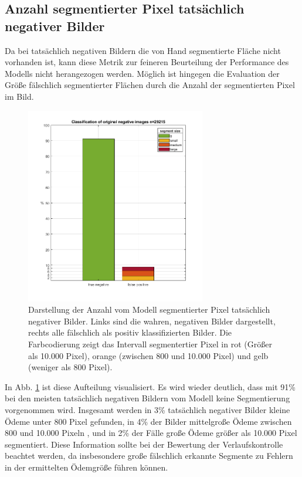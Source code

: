 \subsection{Anzahl segmentierter Pixel tatsächlich negativer Bilder}
Da bei tatsächlich negativen Bildern die von Hand segmentierte Fläche nicht vorhanden ist, kann diese Metrik zur feineren Beurteilung der Performance des Modells nicht herangezogen werden. Möglich ist hingegen die Evaluation der Größe fälschlich segmentierter Flächen durch die Anzahl der segmentierten Pixel im Bild.\newline

\begin{figure}[H]
\centering
\includegraphics[width=0.7\textwidth]{./pic/Segmentierung/trueNeg_fp_imglevel_n.png}
\caption{\label{fig:trueneg}Darstellung der Anzahl vom Modell segmentierter Pixel tatsächlich negativer Bilder. Links sind die wahren, negativen Bilder dargestellt, rechts alle fälschlich als positiv klassifizierten Bilder. Die Farbcodierung zeigt das Intervall segmentertier Pixel in rot (Größer als 10.000 Pixel), orange (zwischen 800 und 10.000 Pixel) und gelb (weniger als 800 Pixel).}
\end{figure}
In Abb. \ref{fig:trueneg} ist diese Aufteilung visualisiert. Es wird wieder deutlich, dass mit 91\% bei den meisten tatsächlich negativen Bildern vom Modell keine Segmentierung vorgenommen wird. Insgesamt werden in 3\% tatsächlich negativer Bilder kleine Ödeme unter 800 Pixel gefunden, in 4\% der Bilder mittelgroße Ödeme zwischen 800 und 10.000 Pixeln , und in 2\% der Fälle große Ödeme größer als 10.000 Pixel segmentiert.\newline
Diese Information sollte bei der Bewertung der Verlaufskontrolle beachtet werden, da insbesondere große fälschlich erkannte Segmente zu Fehlern in der ermittelten Ödemgröße führen können.


